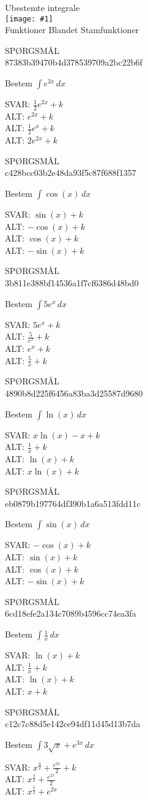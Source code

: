 \documentclass[]{article}
\newcounter{spgcounter}
\newenvironment{question}[2]{\addtocounter{spgcounter}{1} SPØRGSMÅL \thespgcounter\\}{\hspace{50px}}
\newcommand{\name}[1]{{\huge #1}\\}
\newcommand{\tag}[1]{#1}
\newcommand{\cover}[1]{\texttt{[image: \#1]}\\}
\newcommand{\answer}[1]{{\color{green} SVAR: #1}\\}
\newcommand{\alt}[1]{{\color{red} ALT: #1}\\}
\begin{document}
\name{Ubestemte integrale}
\cover{sinintegral.png}
\tag{Funktioner}
\tag{Blandet}
\tag{Stamfunktioner}

\begin{question}{multi}\id{87383b39470b4d378539709a2bc22b6f}

Bestem $\int{e^{2x}}\, dx$

\answer{$\frac{1}{2}e^{2x} + k$}
\alt{$e^{2x} + k$}
\alt{$\frac{1}{2}e^{x} + k$}
\alt{$2e^{2x} + k$}

\end{question}

\begin{question}{multi}\id{c428bcc03b2e48da93f5c87f688f1357}

Bestem $\int{\cos(x)}\, dx$

\answer{$\sin(x) + k$}
\alt{$-\cos(x) + k$}
\alt{$\cos(x) + k$}
\alt{$-\sin(x) + k$}

\end{question}

\begin{question}{multi}\id{3b811e388bf14536a1f7cf6386d48bd0}

Bestem $\int{5e^x}\, dx$

\answer{$5e^x + k$}
\alt{$\frac{5}{e^x} + k$}
\alt{$e^x + k$}
\alt{$\frac{5}{x} + k$}

\end{question}

\begin{question}{multi}\id{4890b8d225f6456a83ba3d25587d9680}

Bestem $\int{\ln(x)}\, dx$

\answer{$x\ln(x) - x + k$}
\alt{$\frac{1}{x} + k$}
\alt{$\ln(x) + k$}
\alt{$x\ln(x) + k$}

\end{question}

\begin{question}{multi}\id{eb0879b197764df390b1a6a513fdd11c}

Bestem $\int{\sin(x)}\, dx$

\answer{$-\cos(x) + k$}
\alt{$\sin(x) + k$}
\alt{$\cos(x) + k$}
\alt{$-\sin(x) + k$}

\end{question}

\begin{question}{multi}\id{6cd18efe2a134c7089b4596cc74ea3fa}

Bestem $\int \frac{1}{x}\, dx $

\answer{$\ln(x) + k$}
\alt{$\frac{1}{x} + k$}
\alt{$\ln(x) + k$}
\alt{$x + k$}

\end{question}

\begin{question}{multi}\id{c12c7c88d5e142ce94df11d45d13b7da}

Bestem $\int 3 \sqrt{x} + e^{3 x}\, dx$
    
\answer{$x^{\frac{3}{2}} + \frac{e^{2x}}{2} + k$}
\alt{$x^{\frac{4}{2}} + \frac{e^{2x}}{2}$}
\alt{$x^{\frac{3}{2}} + e^{2x}$}

\end{question}
\end{document}
